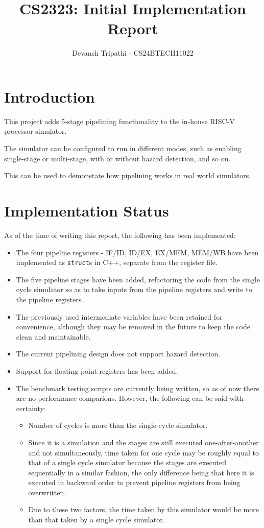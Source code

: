\documentclass{report}
\title{CS2323: Initial Implementation Report}
\author{Devansh Tripathi - CS24BTECH11022}
\date{}
\begin{document}
\maketitle
\newpage

\tableofcontents
\newpage

\section{Introduction}
This project adds 5-stage pipelining functionality to the in-house RISC-V processor simulator.

The simulator can be configured to run in different modes, such as enabling single-stage or multi-stage, with or without hazard detection, and so on.

This can be used to demonstate how pipelining works in real world simulators.

\section{Implementation Status}
As of the time of writing this report, the following has been implemented:
\begin{itemize}
    \item The four pipeline registers - IF/ID, ID/EX, EX/MEM, MEM/WB have been implemented as \texttt{struct}s in C++, separate from the register file.
    \item The five pipeline stages have been added, refactoring the code from the single cycle simulator so as to take inputs from the pipeline registers and write to the pipeline registers.
    \item The previously used intermediate variables have been retained for convenience, although they may be removed in the future to keep the code clean and maintainable.
    \item The current pipelining design does not support hazard detection.
    \item Support for floating point registers has been added.
    \item The benchmark testing scripts are currently being written, so as of now there are no performance comparions. However, the following can be said with certainty:
    \begin{itemize}
        \item Number of cycles is more than the single cycle simulator.
        \item Since it is a simulation and the stages are still executed one-after-another and not simultaneously, time taken for one cycle may be roughly equal to that of a single cycle simulator because the stages are executed sequentially in a similar fashion, the only difference being that here it is executed in backward order to prevent pipeline registers from being overwritten.
        \item Due to these two factors, the time taken by this simulator would be more than that taken by a single cycle simulator.
    \end{itemize}
\end{itemize}
\end{document}
